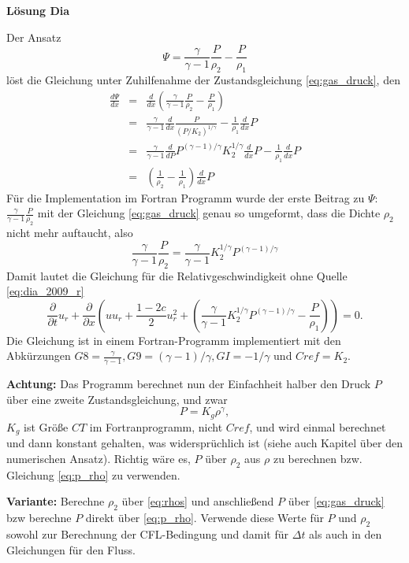 {\bf Lösung Dia}

Der Ansatz
\begin{equation}
\Psi = \frac{\gamma}{\gamma-1} \frac{P}{\rho_2} -
\frac{P}{\rho_1}\label{eq:ur_Psi}
\end{equation}
löst die Gleichung unter Zuhilfenahme der Zustandsgleichung
\ref{eq:gas_druck}, den
\begin{eqnarray*}
\frac{d\Psi}{dx} &=& \frac{d}{dx}\left(
\frac{\gamma}{\gamma-1} \frac{P}{\rho_2} -
\frac{P}{\rho_1}
\right)\\
%
&=& \frac{\gamma}{\gamma-1} \frac{d}{dx}\frac{P}{(P/K_2)^{1/\gamma}}
- \frac{1}{\rho_1} \frac{d}{dx}P\\
%
&=& \frac{\gamma}{\gamma-1} \frac{d}{d P} P^{(\gamma-1)/\gamma}K_2^{1/\gamma}
\frac{d}{dx} P - \frac{1}{\rho_1} \frac{d}{dx}P\\
%
&=&\left( \frac{1}{\rho_2}-\frac{1}{\rho_1}\right)\frac{d}{dx}P
\end{eqnarray*}
Für die Implementation im Fortran Programm wurde der erste Beitrag zu
$\Psi$: $\frac{\gamma}{\gamma-1} \frac{P}{\rho_2}$ mit der Gleichung
\ref{eq:gas_druck} genau so umgeformt, dass die Dichte $\rho_2$ nicht
mehr auftaucht, also
\[
\frac{\gamma}{\gamma-1} \frac{P}{\rho_2} = \frac{\gamma}{\gamma-1}
K_2^{1/\gamma} P^{(\gamma-1)/\gamma}
\]
Damit lautet die Gleichung für die Relativgeschwindigkeit ohne Quelle
\ref{eq:dia_2009_r}
\begin{equation}
\frac{\partial}{\partial t} u_r + \frac{\partial}{\partial x} \left(
uu_r + \frac{1-2c}{2} u_r^2 + \left(\frac{\gamma}{\gamma-1}
K_2^{1/\gamma} P^{(\gamma-1)/\gamma}  -
\frac{P}{\rho_1} \right)\right)
= 0. \label{eq:dia_2009_r2}
\end{equation}
Die Gleichung ist in einem Fortran-Programm implementiert mit den
Abkürzungen $G8 = \frac{\gamma}{\gamma-1}, G9 = (\gamma-1)/\gamma,GI =
-1/\gamma$ und $Cref = K_2$.
 
{\bf Achtung:} Das Programm berechnet nun der Einfachheit halber den
Druck $P$ über eine zweite Zustandsgleichung, und zwar
\begin{equation}
P = K_g \rho^{\gamma},\label{eq:druck_rho}
\end{equation}
$K_g$ ist Größe $CT$ im Fortranprogramm, nicht $Cref$, und wird
einmal berechnet und dann konstant gehalten, was widersprüchlich ist
(siehe auch Kapitel über den numerischen Ansatz). Richtig wäre es, $P$ über
$\rho_2$ aus $\rho$ zu berechnen bzw. Gleichung \ref{eq:p_rho} zu
verwenden.

{\bf Variante: } Berechne $\rho_2$ über \ref{eq:rhos} und anschließend
$P$ über \ref{eq:gas_druck} bzw berechne $P$ direkt über
\ref{eq:p_rho}. Verwende diese Werte für $P$ und $\rho_2$ sowohl zur
Berechnung der CFL-Bedingung und damit für $\Delta t$ als auch in den
Gleichungen für den Fluss.

